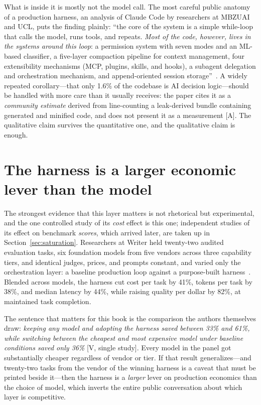 What is inside it is mostly not the model call. The most careful public anatomy of a production harness, an analysis of Claude Code by researchers at MBZUAI and UCL, puts the finding plainly: ``the core of the system is a simple while-loop that calls the model, runs tools, and repeats. \emph{Most of the code, however, lives in the systems around this loop}: a permission system with seven modes and an ML-based classifier, a five-layer compaction pipeline for context management, four extensibility mechanisms (MCP, plugins, skills, and hooks), a subagent delegation and orchestration mechanism, and append-oriented session storage''~\cite{claude-code-anatomy}. A widely repeated corollary---that only 1.6\% of the codebase is AI decision logic---should be handled with more care than it usually receives: the paper cites it as a \emph{community estimate} derived from line-counting a leak-derived bundle containing generated and minified code, and does not present it as a measurement [A]. The qualitative claim survives the quantitative one, and the qualitative claim is enough.

\section{The harness is a larger economic lever than the model}
\label{sec:harness-measure}

The strongest evidence that this layer matters is not rhetorical but experimental, and the one controlled study of its \emph{cost} effect is this one; independent studies of its effect on benchmark \emph{scores}, which arrived later, are taken up in Section~\ref{sec:saturation}. Researchers at Writer held twenty-two audited evaluation tasks, six foundation models from five vendors across three capability tiers, and identical judges, prices, and prompts constant, and varied only the orchestration layer: a baseline production loop against a purpose-built harness~\cite{harness-effect}. Blended across models, the harness cut cost per task by 41\%, tokens per task by 38\%, and median latency by 44\%, while raising quality per dollar by 82\%, at maintained task completion.

The sentence that matters for this book is the comparison the authors themselves draw: \emph{keeping any model and adopting the harness saved between 33\% and 61\%, while switching between the cheapest and most expensive model under baseline conditions saved only 36\%} [V, single study]. Every model in the panel got substantially cheaper regardless of vendor or tier. If that result generalizes---and twenty-two tasks from the vendor of the winning harness is a caveat that must be printed beside it---then the harness is a \emph{larger} lever on production economics than the choice of model, which inverts the entire public conversation about which layer is competitive.

